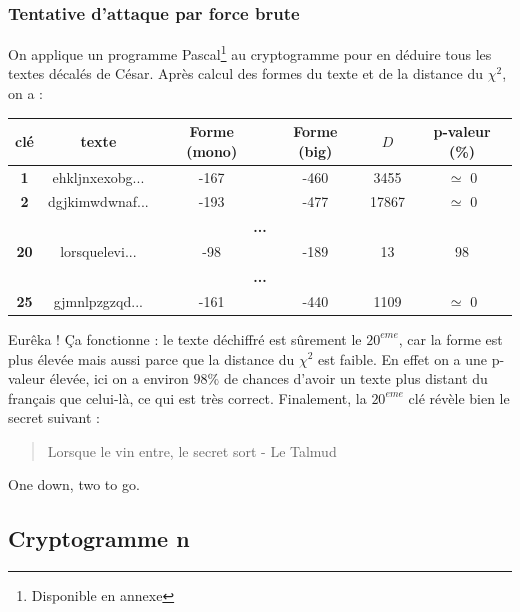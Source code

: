 \documentclass[a4paper, titlepage]{livret}
\begin{document}
\subsubsection{Tentative d'attaque par force brute}

On applique un programme Pascal\footnote{Disponible en annexe} au cryptogramme pour en déduire tous les textes \og décalés \fg{} de César.
Après calcul des formes du texte et de la distance du $\chi^{2}$, on a :
\begin{center}
\begin{tabular}{|c|c|c|c|c|c|}
 \hline
	\textbf{clé}& \textbf{texte} & \textbf{Forme (mono)} & \textbf{Forme (big)} & \textbf{$D$} & \textbf{p-valeur (\%)}\\
	\hline
	\textbf{1} & ehkljnxexobg... &  -167 & -460 & 3455 & $\simeq$ 0\\
	\hline
	\textbf{2} & dgjkimwdwnaf... &  -193 & -477 & 17867 & $\simeq$ 0\\
	\hline
	\multicolumn{6}{|c|}{\textbf{...}}\\
	\hline
	\textbf{20} & lorsquelevi... &   -98 & -189 & 13 & 98 \\
	\hline
	\multicolumn{6}{|c|}{\textbf{...}}\\
	\hline
	\textbf{25} & gjmnlpzgzqd... &  -161 & -440 & 1109 & $\simeq$ 0\\
	\hline
\end{tabular}
  \label{tab77}
\end{center}
Eurêka ! Ça fonctionne : le texte déchiffré est sûrement le $20^{eme}$, car la forme est plus élevée mais aussi parce que la distance du $\chi^{2}$ est faible. En effet on a une p-valeur élevée, ici on a environ $98\%$ de chances d'avoir un texte plus distant du français que celui-là, ce qui est très correct.
Finalement, la $20^{eme}$ clé révèle bien le secret suivant : 

\begin{center}
\begin{quote}
\og Lorsque le vin entre, le secret sort - Le Talmud\fg{}
\end{quote}
\end{center}

One down, two to go.

\subsection{Cryptogramme n}
\end{document}
